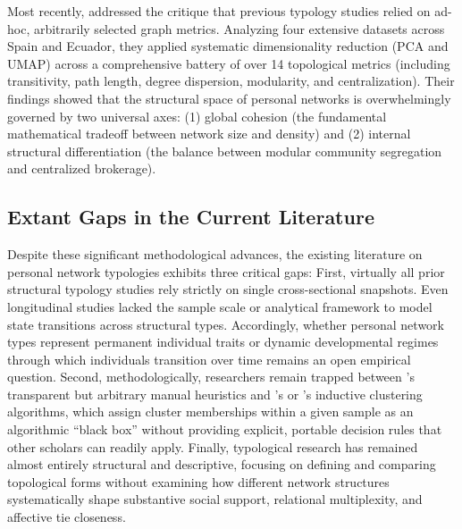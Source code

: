 \documentclass[12pt]{article}
\begin{document}
Most recently, \citet{gonzalezcasado2024towards} addressed the critique that previous typology studies relied on ad-hoc, arbitrarily selected graph metrics. Analyzing four extensive datasets across Spain and Ecuador, they applied systematic dimensionality reduction (PCA and UMAP) across a comprehensive battery of over 14 topological metrics (including transitivity, path length, degree dispersion, modularity, and centralization). Their findings showed that the structural space of personal networks is overwhelmingly governed by two universal axes: (1) global cohesion (the fundamental mathematical tradeoff between network size and density) and (2) internal structural differentiation (the balance between modular community segregation and centralized brokerage).

\subsection{Extant Gaps in the Current Literature}

Despite these significant methodological advances, the existing literature on personal network typologies exhibits three critical gaps: First, virtually all prior structural typology studies \citep{gonzalezcasado2024towards, mayajariego2021building, mccarty2002structure, vacca2020structure} rely strictly on single cross-sectional snapshots. Even longitudinal studies \citep{bidart2005evolutions-c22, bidart2018personal, mayajariego2023use} lacked the sample scale or analytical framework to model state transitions across structural types. Accordingly, whether personal network types represent permanent individual traits or dynamic developmental regimes through which individuals transition over time remains an open empirical question. Second, methodologically, researchers remain trapped between \citeauthor{bidart2018personal}'s transparent but arbitrary manual heuristics and \citeauthor{vacca2020structure}'s or \citeauthor{gonzalezcasado2024towards}'s inductive clustering algorithms, which assign cluster memberships within a given sample as an algorithmic ``black box'' without providing explicit, portable decision rules that other scholars can readily apply. Finally, typological research has remained almost entirely structural and descriptive, focusing on defining and comparing topological forms without examining how different network structures systematically shape substantive social support, relational multiplexity, and affective tie closeness.
\end{document}
